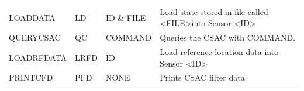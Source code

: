 \documentclass[12pt,english,a4paper]{report}
\begin{document}
\begin{table}[angle=90,!htb]
{\begin{tabular}{llll}
  LOADDATA                    & LD                        & ID \& FILE                    & Load state stored in file called \textless FILE\textgreater into Sensor \textless ID\textgreater \\
  QUERYCSAC                   & QC                        & COMMAND                       & Queries the CSAC with COMMAND.                                                                 \\
  LOADRFDATA                  & LRFD                      & ID                            & Load reference location data into Sensor \textless ID\textgreater                               \\
  PRINTCFD                    & PFD                       & NONE                          & Prints CSAC filter data                                                                        
  \end{tabular}
}
\end{table}

\end{document}
